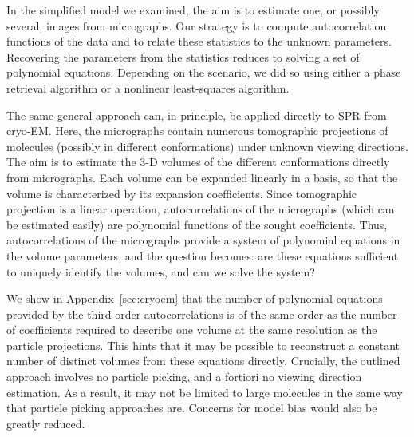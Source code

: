 \documentclass[english,11pt]{article}
\newcommand{\1}{\mathbf{1}}
\newcommand{\TODO}[1]{{\color{red}{[#1]}}}
\numberwithin{equation}{section}
\theoremstyle{plain}
\theoremstyle{definition}
\theoremstyle{remark}
\theoremstyle{plain}
\theoremstyle{remark}
\theoremstyle{plain}
\theoremstyle{plain}
\begin{document}
\TODO{Where and how do we cite Kam? Fred?}

In the simplified model we examined, the aim is to estimate one, or possibly several, images from micrographs. Our strategy is to compute autocorrelation functions of the data and to relate these statistics to the unknown parameters. Recovering the parameters from the statistics reduces to solving a set of polynomial equations. Depending on the scenario, we did so using either a phase retrieval algorithm or a nonlinear least-squares algorithm.

The same general approach can, in principle, be applied directly to SPR from cryo-EM. Here, the micrographs contain numerous tomographic projections of molecules (possibly in different conformations) under unknown viewing directions. The aim is to estimate the 3-D volumes of the different conformations directly from micrographs. Each volume can be expanded linearly in a basis, so that the volume is characterized by its expansion coefficients. Since tomographic projection is a linear operation, autocorrelations of the micrographs (which can be estimated easily) are polynomial functions of the sought coefficients. Thus, autocorrelations of the micrographs provide a system of polynomial equations in the volume parameters, and the question becomes: are these equations sufficient to uniquely identify the volumes, and can we solve the system?

We show in Appendix~\ref{sec:cryoem} that the number of polynomial equations provided by the third-order autocorrelations is of the same order as the number of coefficients required to describe one volume at the same resolution as the particle projections. This hints that it may be possible to reconstruct a constant number of distinct volumes from these equations directly. Crucially, the outlined approach involves no particle picking, and a fortiori no viewing direction estimation. As a result, it may not be limited to large molecules in the same way that particle picking approaches are. Concerns for model bias would also be greatly reduced.

\TODO{Do we want to say something about the number of images that we need? Specifically, do we want to address the fact that the numerical experiments suggest we may need a gigantic number of them for cryo, and mention trends in cryo technology that are encouraging in that regard? (Of course, we can't compare to RELION etc.\ in SNRs so low that one can't particle pick; that's not the point here.)}


\end{document}
